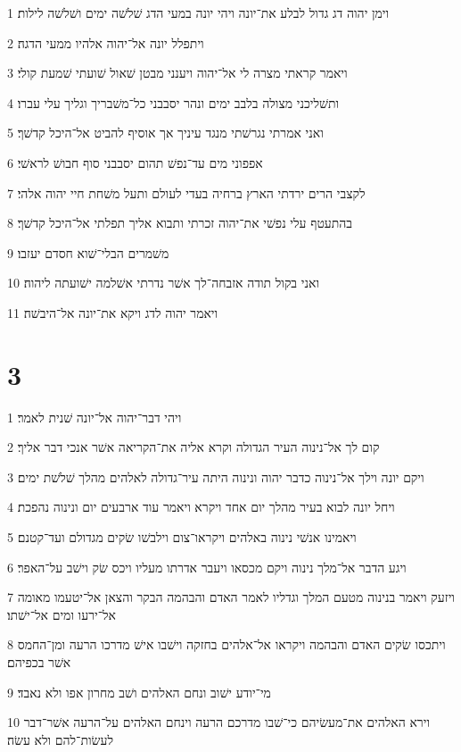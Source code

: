 \par 1 וימן יהוה דג גדול לבלע את־יונה ויהי יונה במעי הדג שׁלשׁה ימים ושׁלשׁה לילות׃
\par 2 ויתפלל יונה אל־יהוה אלהיו ממעי הדגה׃
\par 3 ויאמר קראתי מצרה לי אל־יהוה ויענני מבטן שׁאול שׁועתי שׁמעת קולי׃
\par 4 ותשׁליכני מצולה בלבב ימים ונהר יסבבני כל־משׁבריך וגליך עלי עברו׃
\par 5 ואני אמרתי נגרשׁתי מנגד עיניך אך אוסיף להביט אל־היכל קדשׁך׃
\par 6 אפפוני מים עד־נפשׁ תהום יסבבני סוף חבושׁ לראשׁי׃
\par 7 לקצבי הרים ירדתי הארץ ברחיה בעדי לעולם ותעל משׁחת חיי יהוה אלהי׃
\par 8 בהתעטף עלי נפשׁי את־יהוה זכרתי ותבוא אליך תפלתי אל־היכל קדשׁך׃
\par 9 משׁמרים הבלי־שׁוא חסדם יעזבו׃
\par 10 ואני בקול תודה אזבחה־לך אשׁר נדרתי אשׁלמה ישׁועתה ליהוה׃
\par 11 ויאמר יהוה לדג ויקא את־יונה אל־היבשׁה׃

\chapter{3}

\par 1 ויהי דבר־יהוה אל־יונה שׁנית לאמר׃
\par 2 קום לך אל־נינוה העיר הגדולה וקרא אליה את־הקריאה אשׁר אנכי דבר אליך׃
\par 3 ויקם יונה וילך אל־נינוה כדבר יהוה ונינוה היתה עיר־גדולה לאלהים מהלך שׁלשׁת ימים׃
\par 4 ויחל יונה לבוא בעיר מהלך יום אחד ויקרא ויאמר עוד ארבעים יום ונינוה נהפכת׃
\par 5 ויאמינו אנשׁי נינוה באלהים ויקראו־צום וילבשׁו שׂקים מגדולם ועד־קטנם׃
\par 6 ויגע הדבר אל־מלך נינוה ויקם מכסאו ויעבר אדרתו מעליו ויכס שׂק וישׁב על־האפר׃
\par 7 ויזעק ויאמר בנינוה מטעם המלך וגדליו לאמר האדם והבהמה הבקר והצאן אל־יטעמו מאומה אל־ירעו ומים אל־ישׁתו׃
\par 8 ויתכסו שׂקים האדם והבהמה ויקראו אל־אלהים בחזקה וישׁבו אישׁ מדרכו הרעה ומן־החמס אשׁר בכפיהם׃
\par 9 מי־יודע ישׁוב ונחם האלהים ושׁב מחרון אפו ולא נאבד׃
\par 10 וירא האלהים את־מעשׂיהם כי־שׁבו מדרכם הרעה וינחם האלהים על־הרעה אשׁר־דבר לעשׂות־להם ולא עשׂה׃


